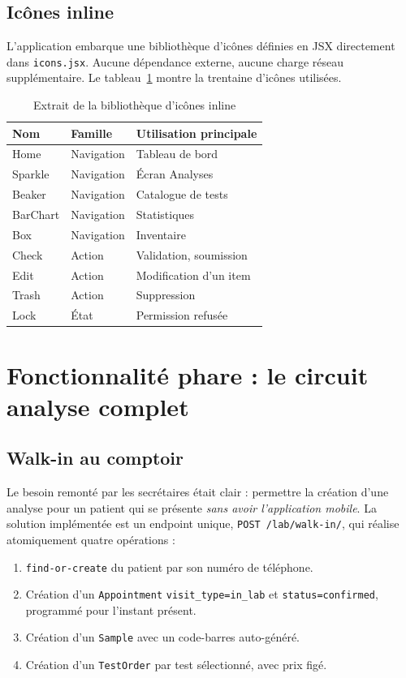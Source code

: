 \documentclass[12pt, a4paper, oneside]{report}
\begin{document}
\subsection{Icônes inline}
L'application embarque une bibliothèque d'icônes définies en JSX
directement dans \texttt{icons.jsx}. Aucune dépendance externe, aucune
charge réseau supplémentaire. Le tableau~\ref{tab:icons} montre la
trentaine d'icônes utilisées.

\begin{table}[ht]
  \centering
  \caption{Extrait de la bibliothèque d'icônes inline}
  \label{tab:icons}
  \begin{tabularx}{\linewidth}{l l X}
    \toprule
    \textbf{Nom} & \textbf{Famille} & \textbf{Utilisation principale} \\
    \midrule
    Home      & Navigation & Tableau de bord \\
    Sparkle   & Navigation & Écran Analyses \\
    Beaker    & Navigation & Catalogue de tests \\
    BarChart  & Navigation & Statistiques \\
    Box       & Navigation & Inventaire \\
    Check     & Action     & Validation, soumission \\
    Edit      & Action     & Modification d'un item \\
    Trash     & Action     & Suppression \\
    Lock      & État       & Permission refusée \\
    \bottomrule
  \end{tabularx}
\end{table}

\section{Fonctionnalité phare : le circuit analyse complet}

\subsection{Walk-in au comptoir}
Le besoin remonté par les secrétaires était clair : permettre la
création d'une analyse pour un patient qui se présente \emph{sans
avoir l'application mobile}. La solution implémentée est un endpoint
unique, \texttt{POST /lab/walk-in/}, qui réalise atomiquement quatre
opérations :

\begin{enumerate}
  \item \texttt{find-or-create} du patient par son numéro de téléphone.
  \item Création d'un \texttt{Appointment} \texttt{visit\_type=in\_lab}
        et \texttt{status=confirmed}, programmé pour l'instant présent.
  \item Création d'un \texttt{Sample} avec un code-barres
        auto-généré.
  \item Création d'un \texttt{TestOrder} par test sélectionné, avec
        prix figé.
\end{enumerate}
\end{document}
